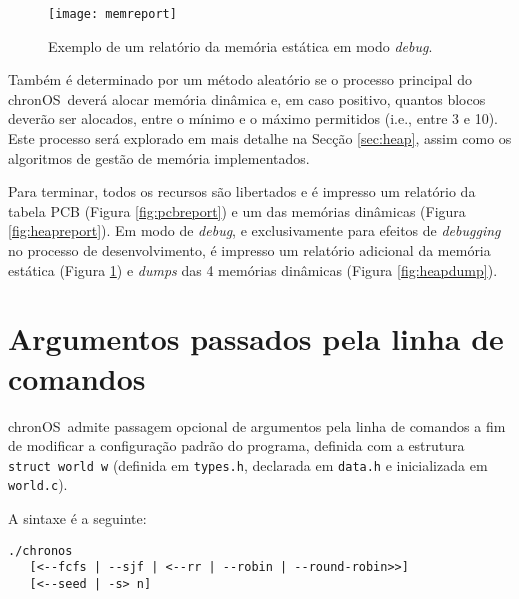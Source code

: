 \documentclass[10pt,oneside]{estiloUBI}
\newcommand{\chronOS}{\textsf{chronOS}}
\begin{document}
	\begin{figure}[!btp]
		\centering
		\texttt{[image: memreport]}
		\caption{Exemplo de um relatório da memória estática em modo \textit{debug}.}
		\label{fig:memreport}
	\end{figure}

	Também é determinado por um método aleatório se o processo principal do \chronOS~deverá alocar memória dinâmica e, em caso positivo, quantos blocos deverão ser alocados, entre o mínimo e o máximo permitidos (i.e., entre 3 e 10). Este processo será explorado em mais detalhe na Secção \ref{sec:heap}, assim como os algoritmos de gestão de memória implementados.

	Para terminar, todos os recursos são libertados e é impresso um relatório da tabela \ac{PCB} (Figura \ref{fig:pcbreport}) e um das memórias dinâmicas (Figura \ref{fig:heapreport}). Em modo de \textit{debug}, e exclusivamente para efeitos de \textit{debugging} no processo de desenvolvimento, é impresso um relatório adicional da memória estática (Figura \ref{fig:memreport}) e \textit{dumps} das 4 memórias dinâmicas (Figura \ref{fig:heapdump}).
	
	
	\section{Argumentos passados pela linha de comandos}
	\label{ssec:main:argv}
	
	\chronOS~admite passagem opcional de argumentos pela linha de comandos a fim de modificar a configuração padrão do programa, definida com a estrutura \texttt{struct world w} (definida em \verb|types.h|, declarada em \verb|data.h| e inicializada em \verb|world.c|).
	
	A sintaxe é a seguinte:
	
	\begin{verbatim}
./chronos
   [<--fcfs | --sjf | <--rr | --robin | --round-robin>>]
   [<--seed | -s> n]
	\end{verbatim}
	
\end{document}
